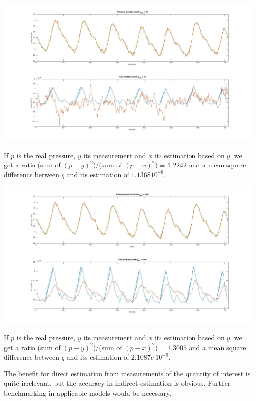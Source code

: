 \documentclass[a4paper]{article}
\newcounter{c}
\newcounter{d}
\newcounter{r}
\newcounter{e}
\begin{document}
\begin{center}
\includegraphics[width=\textwidth]{Images/KFex1}
\end{center}

If $p$ is the real pressure, $y$ its measurement and $x$ its estimation based on $y$, we get a ratio (sum of $(p-y)^2$)/(sum of $(p-x)^2$) = $1.2242$ and a mean square difference between $q$ and its estimation of $1.136810^{-8}$.

\begin{center}
\includegraphics[width=\textwidth]{Images/KFex2}
\end{center}

If $p$ is the real pressure, $y$ its measurement and $x$ its estimation based on $y$, we get a ratio (sum of $(p-y)^2$)/(sum of $(p-x)^2$) = $1.3005$ and a mean square difference between $q$ and its estimation of $2.1087e~10^
{-9}$.

\bigskip

The benefit for direct estimation from measurements of the quantity of interest is quite irrelevant, but the accuracy in indirect estimation is obvious. Further benchmarking in applicable models would be necessary.
\bigskip
\end{document}
